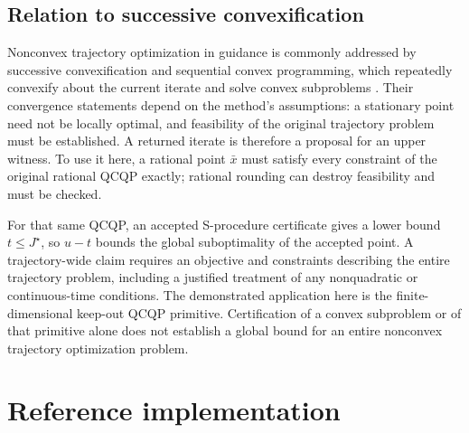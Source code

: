 \documentclass[11pt]{article}
\theoremstyle{plain}
\theoremstyle{remark}
\begin{document}
\subsection{Relation to successive convexification}
\label{sec:scvx}

Nonconvex trajectory optimization in guidance is commonly addressed by successive
convexification and sequential convex programming, which repeatedly convexify
about the current iterate and solve convex subproblems \cite{elango2025}.
Their convergence statements depend on the method's assumptions: a stationary
point need not be locally optimal, and feasibility of the original trajectory
problem must be established. A returned iterate is therefore a proposal for
an upper witness. To use it here, a rational point $\bar x$ must satisfy every
constraint of the original rational QCQP exactly; rational rounding can destroy
feasibility and must be checked.

For that same QCQP, an accepted S-procedure certificate gives a lower bound
$t\le J^\star$, so $u-t$ bounds the global suboptimality of the accepted point.
A trajectory-wide claim requires an objective and constraints describing the
entire trajectory problem, including a justified treatment of any
nonquadratic or continuous-time conditions. The demonstrated application here
is the finite-dimensional keep-out QCQP primitive. Certification of a convex
subproblem or of that primitive alone does not establish a global bound for an
entire nonconvex trajectory optimization problem.

\section{Reference implementation}
\label{sec:impl}
\end{document}
